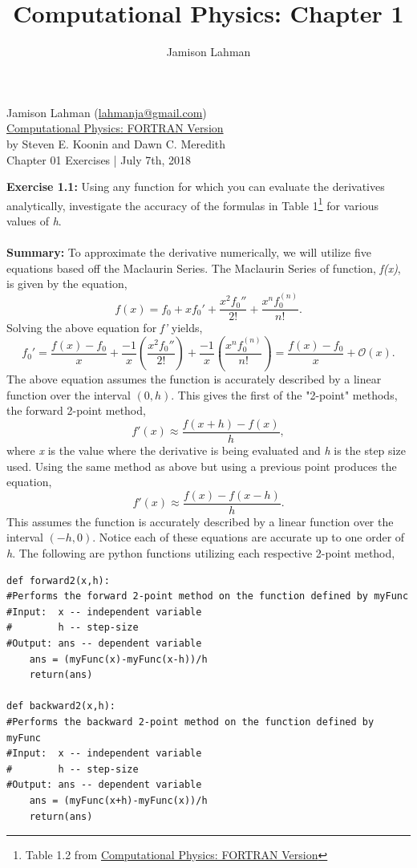 \documentclass[10pt]{article}
\author{Jamison Lahman}
\title{Computational Physics: Chapter 1}
\begin{document}
\begin{flushright}Jamison Lahman (\href{mailto:lahmanja@gmail.com}{lahmanja@gmail.com}) \\
\href{https://www.amazon.com/Computational-Physics-Fortran-Steven-Koonin/dp/0201386232}{Computational Physics: FORTRAN Version} \\
by Steven E. Koonin and Dawn C. Meredith\\
Chapter 01 Exercises | July 7th, 2018 \\
\end{flushright}
\textbf{Exercise 1.1:} Using any function for which you can evaluate the derivatives analytically, investigate the accuracy of the formulas in Table 1\footnote{Table 1.2 from \href{https://www.amazon.com/Computational-Physics-Fortran-Steven-Koonin/dp/0201386232}{Computational Physics: FORTRAN Version}} for various values of \textit{h}. \\
\\
\textbf{Summary:} To approximate the derivative numerically, we will utilize five equations based off the Maclaurin Series. The Maclaurin Series of function, \textit{f(x)}, is given by the equation,
\begin{equation}
	f(x) = f_0 +x f_0'+ \frac{x^2f_0''}{2!} + \frac{x^nf_0^(n)}{n!}.
\end{equation}
Solving the above equation for \textit{f'} yields,
\begin{equation}
	f_0' = \frac{f(x)-f_0}{x}+\frac{-1}{x}\left(\frac{x^2f_0''}{2!} \right)+ \frac{-1}{x} \left(\frac{x^nf_0^{(n)}}{n!}\right) =  \frac{f(x)-f_0}{x}  + \mathcal{O}(x).
\end{equation}
The above equation assumes the function is accurately described by a linear function over the interval $(0,h)$. This gives the first of the "2-point" methods, the forward 2-point method,
\begin{equation}
\label{eq:forward2}
	f'(x) \approx \frac{f(x+h)-f(x)}{h},
\end{equation}
where \textit{x} is the value where the derivative is being evaluated and \textit{h} is the step size used. Using the same method as above but using a previous point produces the equation,
\begin{equation}
\label{eq:backward2}
	f'(x) \approx \frac{f(x)-f(x-h)}{h}.
\end{equation}
This assumes the function is accurately described by a linear function over the interval $(-h,0)$. Notice each of these equations are accurate up to one order of \textit{h}. The following are python functions utilizing each respective 2-point method,
\begin{lstlisting}
def forward2(x,h):
#Performs the forward 2-point method on the function defined by myFunc
#Input:  x -- independent variable
#        h -- step-size
#Output: ans -- dependent variable
    ans = (myFunc(x)-myFunc(x-h))/h
    return(ans)

def backward2(x,h):
#Performs the backward 2-point method on the function defined by myFunc
#Input:  x -- independent variable
#        h -- step-size
#Output: ans -- dependent variable
    ans = (myFunc(x+h)-myFunc(x))/h
    return(ans)
\end{lstlisting}
    
\end{document}
